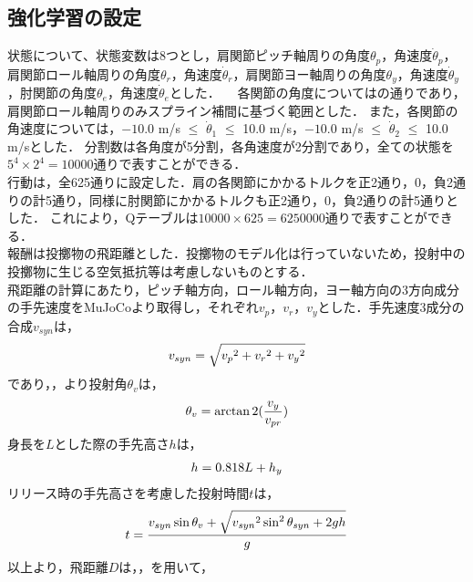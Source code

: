 \begin{small}
\subsection{強化学習の設定}
状態について、状態変数は8つとし，肩関節ピッチ軸周りの角度$\theta_{p}$，角速度$\dot{\theta}_{p}$，肩関節ロール軸周りの角度$\theta_{r}$，角速度$\dot{\theta}_{r}$，肩関節ヨー軸周りの角度$\theta_{y}$，角速度$\dot{\theta}_{y}$，肘関節の角度$\theta_{e}$，角速度$\dot{\theta}_{e}$とした．
　各関節の角度についてはの通りであり，肩関節ロール軸周りのみスプライン補間に基づく範囲とした．
また，各関節の角速度については，$-10.0$ m/s $\le$ $\dot{\theta}_{1}$ $\le$ 10.0 m/s，$-10.0$ m/s $\le$ $\dot{\theta}_{2}$ $\le$ 10.0 m/sとした．
分割数は各角度が5分割，各角速度が2分割であり，全ての状態を$5^{4}\times 2^{4}=10000$通りで表すことができる．\\
行動は，全625通りに設定した．肩の各関節にかかるトルクを正2通り，0，負2通りの計5通り，同様に肘関節にかかるトルクも正2通り，0，負2通りの計5通りとした．
これにより，Qテーブルは$10000 \times 625=6250000$通りで表すことができる．\\
報酬は投擲物の飛距離とした．投擲物のモデル化は行っていないため，投射中の投擲物に生じる空気抵抗等は考慮しないものとする．\\
飛距離の計算にあたり，ピッチ軸方向，ロール軸方向，ヨー軸方向の3方向成分の手先速度をMuJoCoより取得し，それぞれ$v_{p}$，$v_{r}$，$v_{y}$とした．手先速度3成分の合成$v_{syn}$は，
\begin{eqnarray}
  \equlabel{10}
  v_{syn} = \sqrt{{v_{p}}^{2} + {v_{r}}^{2} + {v_{y}}^{2}}
\end{eqnarray}
であり，，より投射角$\theta_{v}$は，
\begin{eqnarray}
  \equlabel{11}
  \theta_{v} = \arctan2(\frac{v_{y}}{v_{pr}})
\end{eqnarray}
身長を$L$とした際の手先高さ$h$は，
\begin{eqnarray}
  \equlabel{12}
  h = 0.818L + h_{y}
\end{eqnarray}
リリース時の手先高さを考慮した投射時間$t$は，
\begin{eqnarray}
  \equlabel{13}
  t = \frac{v_{syn}\sin\theta_{v} + \sqrt{{v_{syn}}^2\sin^2\theta_{syn} + 2gh}}{g}
\end{eqnarray}
以上より，飛距離$D$は，，を用いて，

\end{small}

